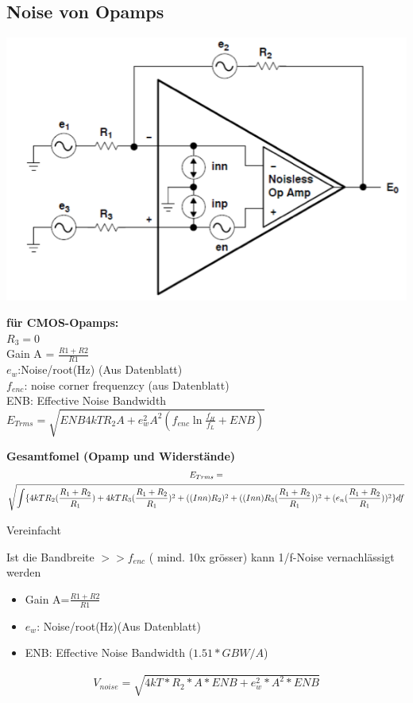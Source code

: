 \subsection{Noise von Opamps}
\begin{multicols}{2}
	\includegraphics[scale=0.4]{pictures/oampnoise}
	\columnbreak
	
	\textbf{für CMOS-Opamps:} \\
	$R_3=0$ \\
	Gain A = $\frac{R1+R2}{R1}$ \\
	$e_{w}$:Noise/root(Hz) (Aus Datenblatt) \\
	$f_{enc}$: noise corner frequenzcy (aus Datenblatt) \\
	ENB: Effective Noise Bandwidth \\
	$E_{Trms}=\sqrt{ENB4kTR_{2}A+e_{w}^2A^2(f_{enc}\ln{\frac{f_{H}}{f_{L}}}+ENB)}$
\end{multicols}

\textbf{Gesamtfomel (Opamp und Widerstände)}\\
\begin{gather*}
E_{Trms}=\notag\\\sqrt{\int
\{4kTR_{2}(\frac{R_{1}+R_{2}}{R_{1}})+4kTR_{3}(\frac{R_{1}+R_{2}}{R_{1}})^2+((Inn)R_{2})^2+((Inn)R_{3}(\frac{R_{1}+R_{2}}{R_{1}}))^2+(e_{n}(\frac{R_{1}+R_{2}}{R_{1}}))^2\}df}
\end{gather*}


Vereinfacht 


Ist die Bandbreite $>>f_{enc}$ ( mind. 10x grösser) kann 1/f-Noise
vernachlässigt werden
\begin{itemize}
  \item Gain A=$\frac{R1+R2}{R1}$
  \item $e_{w}$: Noise/root(Hz)(Aus Datenblatt)
  \item ENB: Effective Noise Bandwidth ($1.51*GBW/A$)
\end{itemize}
\begin{gather}
V_{noise}=\sqrt{4kT*R_{2}*A*ENB+e_{w}^2*A^2*ENB}
\end{gather}
